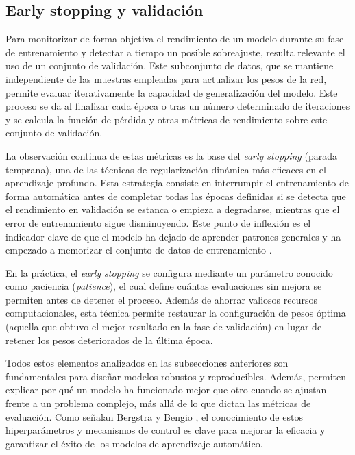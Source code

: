 \subsection{Early stopping y validación}
\label{subsec:EarlyStopping}
Para monitorizar de forma objetiva el rendimiento de un modelo durante su fase de entrenamiento y detectar a tiempo un posible sobreajuste, resulta relevante el uso de un conjunto de validación. Este subconjunto de datos, que se mantiene independiente de las muestras empleadas para actualizar los pesos de la red, permite evaluar iterativamente la capacidad de generalización del modelo. Este proceso se da al finalizar cada época o tras un número determinado de iteraciones y se calcula la función de pérdida y otras métricas de rendimiento sobre este conjunto de validación. 

La observación continua de estas métricas es la base del \textit{early stopping} (parada temprana), una de las técnicas de regularización dinámica más eficaces en el aprendizaje profundo. Esta estrategia consiste en interrumpir el entrenamiento de forma automática antes de completar todas las épocas definidas si se detecta que el rendimiento en validación se estanca o empieza a degradarse, mientras que el error de entrenamiento sigue disminuyendo. Este punto de inflexión es el indicador clave de que el modelo ha dejado de aprender patrones generales y ha empezado a memorizar el conjunto de datos de entrenamiento \cite{bejani2021systematic}.

En la práctica, el \textit{early stopping} se configura mediante un parámetro conocido como paciencia (\textit{patience}), el cual define cuántas evaluaciones sin mejora se permiten antes de detener el proceso. Además de ahorrar valiosos recursos computacionales, esta técnica permite restaurar la configuración de pesos óptima (aquella que obtuvo el mejor resultado en la fase de validación) en lugar de retener los pesos deteriorados de la última época. 

Todos estos elementos analizados en las subsecciones anteriores son fundamentales para diseñar modelos robustos y reproducibles. Además, permiten explicar por qué un modelo ha funcionado mejor que otro cuando se ajustan frente a un problema complejo, más allá de lo que dictan las métricas de evaluación. Como señalan Bergstra y Bengio \cite{bergstra2012random}, el conocimiento de estos hiperparámetros y mecanismos de control es clave para mejorar la eficacia y garantizar el éxito de los modelos de aprendizaje automático.


